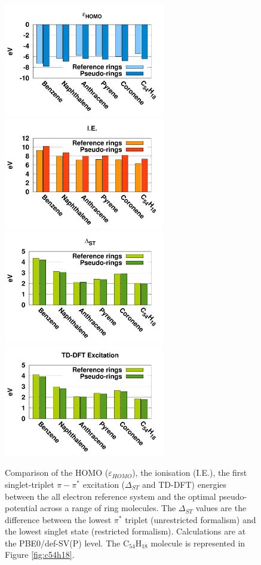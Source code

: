 \documentclass[aip]{revtex4-1}
\begin{document}
\begin{figure}
\begin{center}
\includegraphics[width=7cm]{ring_pbe0_homo}
\includegraphics[width=7cm]{ring_pbe0_ie}
\includegraphics[width=7cm]{ring_pbe0_st}
\includegraphics[width=7cm]{ring_pbe0_tddft}
\end{center}
\caption{Comparison of the HOMO ($\varepsilon_{HOMO}$),
the ionisation (I.E.),
the first singlet-triplet $\pi-\pi^*$ excitation ($\Delta_{ST}$ and TD-DFT) energies
between the
all electron reference system and the optimal pseudo-potential across a range of ring molecules.
The $\Delta_{ST}$ values are the difference
between the lowest $\pi^*$ triplet (unrestricted formalism) and the lowest singlet state
(restricted formalism).
Calculations are at the PBE0/def-SV(P) level.
The C\(_{54}\)H\(_{18}\) molecule is represented in Figure \ref{fig:c54h18}.}
\label{fig:rings_graphs}
\end{figure}
\end{document}
